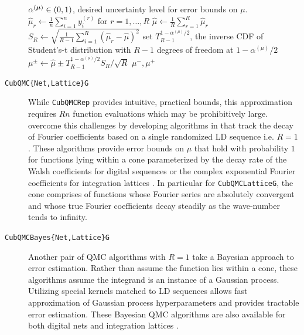 \documentclass{article}[12pt]
\begin{document}
\begin{description}
\begin{algorithm}[h!]
\begin{algorithmic}
        \Require $\alpha^{(\boldsymbol{\mu})} \in (0,1)$, desired uncertainty level for error bounds on $\mu$. \\
        \hrulefill
        \State $\hat{\mu}_r \gets \frac{1}{n} \sum_{i=1}^n y_i^{(r)}$ for $r=1,\dots,R$
        \State $\hat{\mu} \gets \frac{1}{R} \sum_{r=1}^R \hat{\mu}_r$
        \State $S_R \gets \sqrt{\frac{1}{R-1}\sum_{i=1}^R(\hat{\mu}_r - \hat{\mu})^2}$
        \State set $T_{R-1}^{1-\alpha^{(\mu)}/2}$, the inverse CDF of Student's-t distribution with $R-1$ degrees of freedom at $1-\alpha^{(\mu)}/2$
        \State $\mu^\pm \gets \hat{\mu} \pm T_{R-1}^{1-\alpha^{(\mu)}/2}S_R/\sqrt{R}$
        \State \Return $\mu^-,\mu^+$
        \end{algorithmic}
    \end{algorithm}
    \item[\texttt{CubQMC\{Net,Lattice\}G}] While \texttt{CubQMCRep} provides intuitive, practical bounds, this approximation requires $Rn$ function evaluations which may be prohibitively large. \citeauthor{cubqmclattice} overcome this challenges by developing algorithms in \cite{adaptive_qmc} that track the decay of Fourier coefficients based on a single randomized LD sequence i.e. $R=1$. These algorithms provide error bounds on $\mu$ that hold with probability $1$ for functions lying within a cone parameterized by the decay rate of the Walsh coefficients for digital sequences \cite{cubqmcsobol} or the complex exponential Fourier coefficients for integration lattices \cite{cubqmclattice}. In particular for \texttt{CubQMCLatticeG}, the cone comprises of functions whose Fourier series are absolutely convergent and whose true Fourier coefficients decay steadily as the wave-number tends to infinity.
    \item[\texttt{CubQMCBayes\{Net,Lattice\}G}] Another pair of QMC algorithms with $R=1$ take a Bayesian approach to error estimation. Rather than assume the function lies within a cone, these algorithms assume the integrand is an instance of a Gaussian process. 
    Utilizing special kernels matched to LD sequences allows fast approximation of Gaussian process hyperparameters and provides tractable error estimation. These Bayesian QMC algorithms are also available for both digital nets  and integration lattices  \cite{cubqmcbayeslattice}. 
\end{description}
\end{document}
